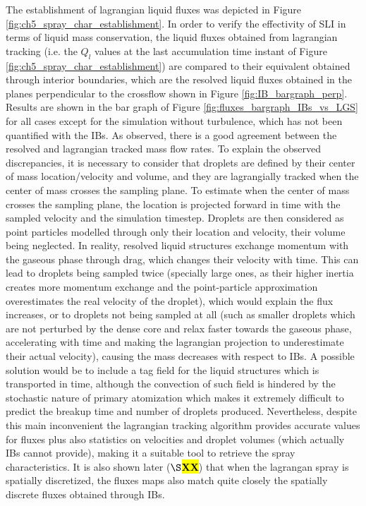 The establishment of lagrangian liquid fluxes was depicted in Figure \ref{fig:ch5_spray_char_establishment}. In order to verify the effectivity of SLI in terms of liquid mass conservation, the liquid fluxes obtained from lagrangian tracking (i.e. the $Q_l$ values at the last accumulation time instant of Figure \ref{fig:ch5_spray_char_establishment}) are compared to their equivalent obtained through interior boundaries, which are the resolved liquid fluxes obtained in the planes perpendicular to the crossflow shown in Figure \ref{fig:IB_bargraph_perp}. Results are shown in the bar graph of Figure \ref{fig:fluxes_bargraph_IBs_vs_LGS} for all cases except for the simulation without turbulence, which has not been quantified with the IBs. As observed, there is a good agreement between the resolved and lagrangian tracked mass flow rates. To explain the observed discrepancies, it is necessary to consider that droplets are defined by their center of mass location/velocity and volume, and they are lagrangially tracked when the center of mass crosses the sampling plane. To estimate when the center of mass crosses the sampling plane, the location is projected forward in time with the sampled velocity and the simulation timestep. Droplets are then considered as point particles modelled through only their location and velocity, their volume being neglected. In reality, resolved liquid structures exchange momentum with the gaseous phase through drag, which changes their velocity with time. This can lead to droplets being sampled twice (specially large ones, as their higher inertia creates more momentum exchange and the point-particle approximation overestimates the real velocity of the droplet), which would explain the flux increases, or to droplets not being sampled at all (such as smaller droplets which are not perturbed by the dense core and relax faster towards the gaseous phase, accelerating with time and making the lagrangian projection to underestimate their actual velocity), causing the mass decreases with respect to IBs. A possible solution would be to include a tag field for the liquid structures which is transported in time, although the convection of such field is hindered by the stochastic nature of primary atomization which makes it extremely difficult to predict the breakup time and number of droplets produced. Nevertheless, despite this main inconvenient the lagrangian tracking algorithm provides accurate values for fluxes plus also statistics on velocities and droplet volumes (which actually IBs cannot provide), making it a suitable tool to retrieve the spray characteristics. It is also shown later ($\S$\hl{\textbf{XX}}) that when the lagrangan spray is spatially discretized, the fluxes maps also match quite closely the spatially discrete fluxes obtained through IBs.




